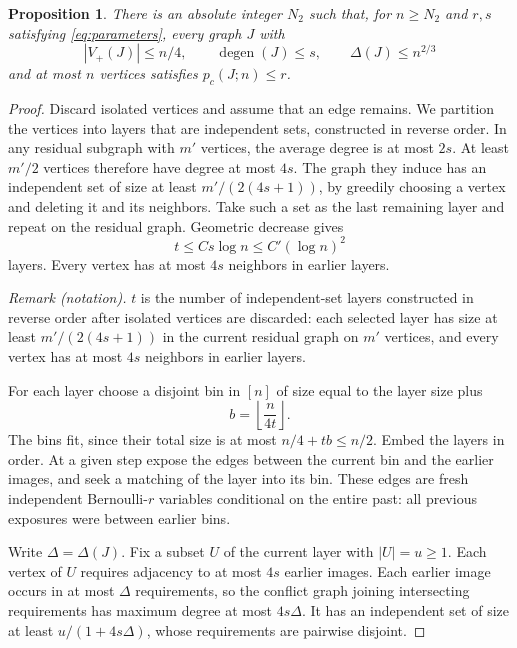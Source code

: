 \documentclass[11pt]{article}
\newtheorem{proposition}[theorem]{Proposition}
\theoremstyle{remark}
\numberwithin{equation}{section}
\DeclareMathOperator{\degen}{degen}
\begin{document}
\begin{proposition}\label{prop:degree-embedding}
There is an absolute integer $N_2$ such that, for $n\geq N_2$
and $r,s$ satisfying \eqref{eq:parameters}, every graph $J$
with
\[
 |V_+(J)|\leq n/4,\qquad \degen(J)\leq s,
 \qquad\Delta(J)\leq n^{2/3}
\]
and at most $n$ vertices satisfies $p_c(J;n)\leq r$.
\end{proposition}
\begin{proof}
Discard isolated vertices and assume that an edge remains.
We partition the vertices into layers that are independent sets, constructed
in reverse order. In any residual subgraph with $m'$ vertices,
the average degree is at most $2s$. At least $m'/2$ vertices
therefore have degree at most $4s$. The graph they induce has
an independent set of size at least $m'/(2(4s+1))$, by greedily
choosing a vertex and deleting it and its neighbors. Take such
a set as the last remaining layer and repeat on the residual
graph. Geometric decrease gives
\begin{equation}\label{eq:layers}
 t\leq C s\log n\leq C'(\log n)^2
\end{equation}
layers. Every vertex has at most $4s$ neighbors in earlier layers.

\noindent\textit{Remark (notation).} $t$ is the number of independent-set layers constructed in reverse order after isolated vertices are discarded: each selected layer has size at least $m'/(2(4s+1))$ in the current residual graph on $m'$ vertices, and every vertex has at most $4s$ neighbors in earlier layers.


For each layer choose a disjoint bin in $[n]$ of size equal to
the layer size plus
\[
 b=\left\lfloor\frac{n}{4t}\right\rfloor.
\]
The bins fit, since their total size is at most $n/4+tb\leq n/2$.
Embed the layers in order. At a given step expose the edges
between the current bin and the earlier images, and seek a
matching of the layer into its bin. These edges are fresh
independent Bernoulli-$r$ variables conditional on the entire
past: all previous exposures were between earlier bins.

Write $\Delta=\Delta(J)$. Fix a subset $U$ of the current
layer with $|U|=u\geq1$. Each vertex of $U$ requires adjacency
to at most $4s$ earlier images. Each earlier image occurs in at
most $\Delta$ requirements, so the conflict graph joining
intersecting requirements has maximum degree at most $4s\Delta$.
It has an independent set of size at least
$u/(1+4s\Delta)$, whose requirements are pairwise disjoint.


\end{proof}
\end{document}
